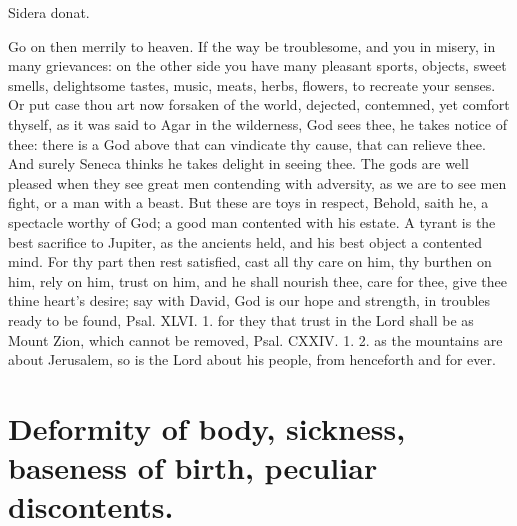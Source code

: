 {Sidera donat.

Go on then merrily to heaven. If the way be troublesome, and you in
misery, in many grievances: on the other side you have many pleasant
sports, objects, sweet smells, delightsome tastes, music, meats, herbs,
flowers, \etc{} to recreate your senses. Or put case thou art now forsaken
of the world, dejected, contemned, yet comfort thyself, as it was said
to Agar in the wilderness, God sees thee, he takes notice of
thee: there is a God above that can vindicate thy cause, that can
relieve thee. And surely Seneca thinks he takes delight in seeing
thee. The gods are well pleased when they see great men contending with
adversity, as we are to see men fight, or a man with a beast. But these
are toys in respect,  Behold, saith he, a spectacle worthy of
God; a good man contented with his estate. A tyrant is the best
sacrifice to Jupiter, as the ancients held, and his best object a
contented mind. For thy part then rest satisfied, cast all thy care on
him, thy burthen on him, rely on him, trust on him, and he shall
nourish thee, care for thee, give thee thine heart's desire; say with
David, God is our hope and strength, in troubles ready to be found,
Psal. XLVI. 1. for they that trust in the Lord shall be as Mount Zion,
which cannot be removed, Psal. CXXIV. 1. 2. as the mountains are about
Jerusalem, so is the Lord about his people, from henceforth and for
ever.


\section{Deformity of body, sickness, baseness of birth, peculiar discontents.}

}

